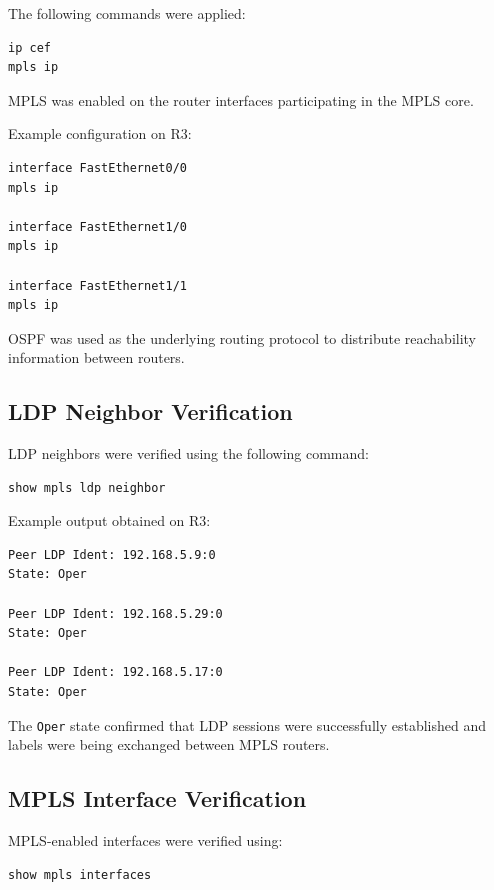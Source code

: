 \documentclass[12pt]{article}
\begin{document}
The following commands were applied:

\begin{lstlisting}
ip cef
mpls ip
\end{lstlisting}

MPLS was enabled on the router interfaces participating in the MPLS core.

Example configuration on R3:

\begin{lstlisting}
interface FastEthernet0/0
mpls ip

interface FastEthernet1/0
mpls ip

interface FastEthernet1/1
mpls ip
\end{lstlisting}

OSPF was used as the underlying routing protocol to distribute reachability information between routers.

\subsection{LDP Neighbor Verification}

LDP neighbors were verified using the following command:

\begin{lstlisting}
show mpls ldp neighbor
\end{lstlisting}

Example output obtained on R3:

\begin{lstlisting}
Peer LDP Ident: 192.168.5.9:0
State: Oper

Peer LDP Ident: 192.168.5.29:0
State: Oper

Peer LDP Ident: 192.168.5.17:0
State: Oper
\end{lstlisting}

The \texttt{Oper} state confirmed that LDP sessions were successfully established and labels were being exchanged between MPLS routers.

\subsection{MPLS Interface Verification}

MPLS-enabled interfaces were verified using:

\begin{lstlisting}
show mpls interfaces
\end{lstlisting}
\end{document}
